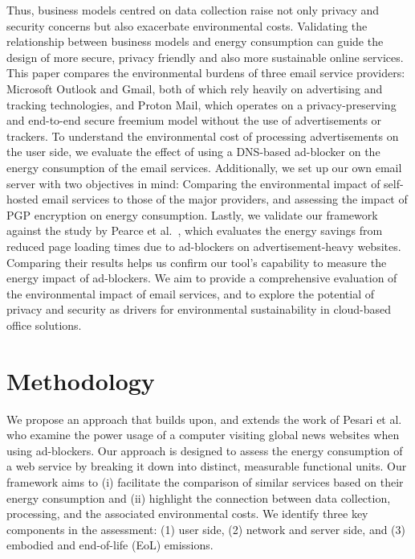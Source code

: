 \documentclass[sigconf,9pt,usenames,dvipsnames,table]{acmart}
\begin{document}
Thus, business models centred on data collection raise not only privacy and
security concerns but also exacerbate environmental costs. Validating the
relationship between business models and energy consumption can guide the
design of more secure, privacy friendly and also more sustainable online
services.
This paper compares the environmental burdens of three email service providers:
Microsoft Outlook and Gmail, both of which rely heavily on advertising and tracking technologies, and Proton Mail, which operates on a privacy-preserving and end-to-end secure freemium model without the use of advertisements or trackers.
To understand the environmental cost of processing advertisements on the user side, we evaluate the effect of using a DNS-based ad-blocker on the energy consumption of the email services.
Additionally, we set up our own email server with two objectives in mind: 
Comparing the environmental impact of self-hosted email services to those of the major providers, and assessing the impact of PGP encryption on energy consumption.
Lastly, we validate our framework against the study by Pearce et al.~\cite{pearce2020energy}, which evaluates the energy savings from reduced page loading times due to ad-blockers on advertisement-heavy websites. Comparing their results helps us confirm our tool's capability to measure the energy impact of ad-blockers.
We aim to provide a comprehensive evaluation of the environmental impact of email services, and to explore the potential of privacy and security as drivers for environmental sustainability in cloud-based office solutions.

\section{Methodology}

We propose an approach that builds upon, and extends the work of Pesari et
al.~\cite{pesari2023client} who examine the power usage of a computer visiting global news websites when using ad-blockers.
Our approach is designed to assess the energy consumption of a web service by breaking
it down into distinct, measurable functional units. Our framework aims to (i) facilitate the
comparison of similar services based on their energy consumption and (ii)
highlight the connection between data collection, processing, and the
associated environmental costs. We identify three key components in the
assessment: (1) user side, (2) network and server side, and (3) embodied
and end-of-life (EoL) emissions.
\end{document}
